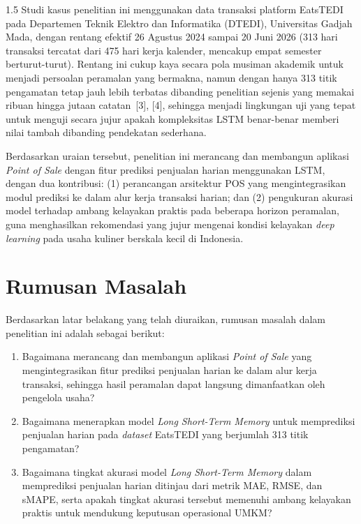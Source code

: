 \documentclass[12pt, a4paper, onecolumn, oneside]{report}
\begin{document}
\begin{spacing}{1.5}
Studi kasus penelitian ini menggunakan data transaksi platform EatsTEDI pada Departemen Teknik Elektro dan Informatika (DTEDI), Universitas Gadjah Mada, dengan rentang efektif 26 Agustus 2024 sampai 20 Juni 2026 (313 hari transaksi tercatat dari 475 hari kerja kalender, mencakup empat semester berturut-turut). Rentang ini cukup kaya secara pola musiman akademik untuk menjadi persoalan peramalan yang bermakna, namun dengan hanya 313 titik pengamatan tetap jauh lebih terbatas dibanding penelitian sejenis yang memakai ribuan hingga jutaan catatan~[3], [4], sehingga menjadi lingkungan uji yang tepat untuk menguji secara jujur apakah kompleksitas LSTM benar-benar memberi nilai tambah dibanding pendekatan sederhana.

Berdasarkan uraian tersebut, penelitian ini merancang dan membangun aplikasi \textit{Point of Sale} dengan fitur prediksi penjualan harian menggunakan LSTM, dengan dua kontribusi: (1) perancangan arsitektur POS yang mengintegrasikan modul prediksi ke dalam alur kerja transaksi harian; dan (2) pengukuran akurasi model terhadap ambang kelayakan praktis pada beberapa horizon peramalan, guna menghasilkan rekomendasi yang jujur mengenai kondisi kelayakan \textit{deep learning} pada usaha kuliner berskala kecil di Indonesia.

\section{Rumusan Masalah}
Berdasarkan latar belakang yang telah diuraikan, rumusan masalah dalam penelitian ini adalah sebagai berikut:
\begin{enumerate}
    \item Bagaimana merancang dan membangun aplikasi \textit{Point of Sale} yang mengintegrasikan fitur prediksi penjualan harian ke dalam alur kerja transaksi, sehingga hasil peramalan dapat langsung dimanfaatkan oleh pengelola usaha?
    \item Bagaimana menerapkan model \textit{Long Short-Term Memory} untuk memprediksi penjualan harian pada \textit{dataset} EatsTEDI yang berjumlah 313 titik pengamatan?
    \item Bagaimana tingkat akurasi model \textit{Long Short-Term Memory} dalam memprediksi penjualan harian ditinjau dari metrik MAE, RMSE, dan sMAPE, serta apakah tingkat akurasi tersebut memenuhi ambang kelayakan praktis untuk mendukung keputusan operasional UMKM?
\end{enumerate}


\end{spacing}
\end{document}
